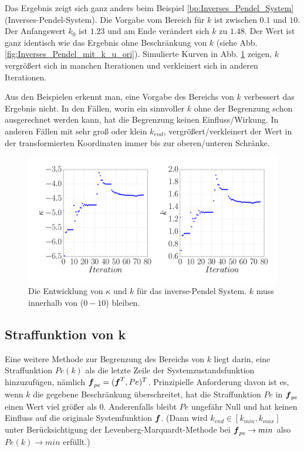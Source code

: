 Das Ergebnis zeigt sich ganz anders beim Beispiel \ref{bp:Inverses_Pendel_System} (Inverses-Pendel-System). Die Vorgabe vom Bereich für $k$ ist zwischen $0.1$ und $10$. Der Anfangswert $k_{0}$ ist $1.23$ und am Ende verändert sich $k$ zu $1.48$. Der Wert ist ganz identisch wie das Ergebnis ohne Beschränkung von $k$ (siehe Abb. \ref{fig:Inverses_Pendel_mit_k_u_ori}). Simulierte Kurven in Abb. \ref{fig:Inverses_Pendel_mit_k_con_sk_10} zeigen, $k$ vergrößert sich in manchen Iterationen und verkleinert sich in anderen Iterationen.

Aus den Beispielen erkennt man, eine Vorgabe des Bereichs von $k$ verbessert das Ergebnis nicht. In den Fällen, worin ein sinnvoller $k$ ohne der Begrenzung schon ausgerechnet werden kann, hat die Begrenzung keinen Einfluss/Wirkung. In anderen Fällen mit sehr groß oder klein $k_{end}$, vergrößert/verkleinert der Wert in der transformierten Koordinaten immer bis zur oberen/unteren Schränke.
\begin{figure}[!h]
	\centering
	\includegraphics[width=0.7\linewidth]{bild/30_32/example0_mit_k_con_sk_10.pdf}%
	\caption{Die Entwicklung von $\kappa$ und $k$ für das inverse-Pendel System. $k$ muss innerhalb von ($0-10$) bleiben.}
	\label{fig:Inverses_Pendel_mit_k_con_sk_10}
\end{figure}

\subsection{Straffunktion von k}
\label{Straffunktion_von_k}
Eine weitere Methode zur Begrenzung des Bereichs von $k$ liegt darin, eine Straffunktion $Pe(k)$ als die letzte Zeile der Systemzustandsfunktion hinzuzufügen, nämlich $\boldsymbol f_{pe} = (\boldsymbol f^{T}, Pe)^{T}$. Prinzipielle Anforderung davon ist es, wenn $k$ die gegebene Beschränkung überschreitet, hat die Straffunktion $Pe$ in $\boldsymbol f_{pe}$ einen Wert viel größer als $0$. Anderenfalls bleibt $Pe$ ungefähr Null und hat keinen Einfluss auf die originale Systemfunktion $\boldsymbol f$. (Dann wird $k_{end}\in[k_{min},k_{max}]$ unter Berücksichtigung der Levenberg-Marquardt-Methode bei $\boldsymbol f_{pe}\rightarrow  min$ also $Pe(k)\rightarrow min$ erfüllt.)

